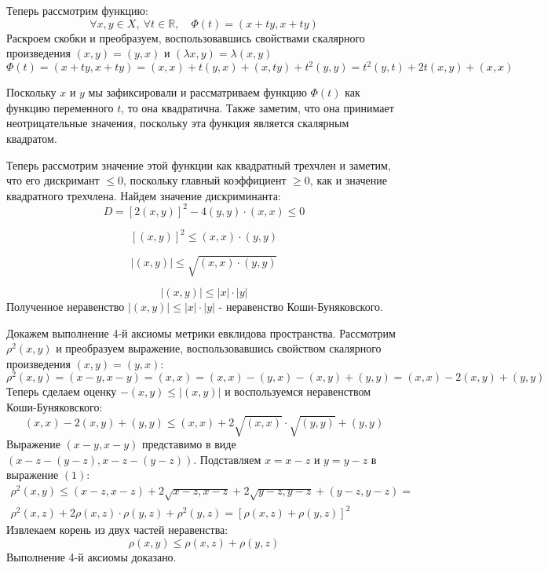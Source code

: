 Теперь рассмотрим функцию: 
$$
\forall x,y \in X, \: \forall t \in \mathbb {R}, \quad \Phi(t) = (x +ty, x + ty)
$$
Раскроем скобки и преобразуем, воспользовавшись свойствами скалярного произведения $(x, y) = (y, x)$ и $(\lambda x, y) = \lambda (x, y)$
$$
\Phi(t) = (x +ty, x + ty) = (x, x) + t(y, x) + (x, ty) + t^2(y, y) = t^2(y, t) + 2t(x, y) + (x, x)
$$

Поскольку $x$ и $y$ мы зафиксировали и рассматриваем  функцию $\Phi(t)$ как функцию переменного $t$, то она квадратична. Также заметим, что она принимает неотрицательные значения, поскольку эта функция является скалярным квадратом.

Теперь рассмотрим значение этой функции как квадратный трехчлен и заметим, что его дискримант $\leq 0$, поскольку главный коэффициент $\geq 0$, как и значение квадратного трехчлена. Найдем значение дискриминанта: 
$$
D = [2(x, y)]^2 - 4(y, y) \cdot (x, x) \leq 0
$$

$$
[(x, y)]^2 \leq (x, x) \cdot (y, y)
$$

$$
|(x, y)| \leq \sqrt{(x, x) \cdot (y, y)}
$$

$$
|(x, y)| \leq |x| \cdot |y|
$$
Полученное неравенство $|(x, y)| \leq |x| \cdot |y|$ - неравенство Коши-Буняковского.

Докажем выполнение 4-й аксиомы метрики евклидова пространства. Рассмотрим $\rho^2(x, y)$ и преобразуем выражение, воспользовавшись свойством скалярного произведения $(x, y) = (y, x)$:
$$
\rho^2(x, y) = (x - y, x - y) = (x, x) = (x, x) - (y, x) - (x, y) + (y, y) = (x, x) - 2(x, y) + (y, y)
$$
Теперь сделаем оценку $-(x, y) \leq |(x, y)|$ и воспользуемся неравенством Коши-Буняковского:
\begin{equation}
(x, x) - 2(x, y) + (y, y) \leq (x, x) + 2 \sqrt{(x, x)} \cdot \sqrt{(y, y)} + (y, y)
\end{equation}
Выражение $(x - y, x - y)$ представимо в виде $(x - z - (y - z), x - z - (y - z))$. Подставляем $x = x - z$ и $y = y - z$ в выражение $(1)$:
\begin{equation*}
\begin{gathered}
\rho^2(x, y) \leq (x - z, x - z) + 2\sqrt{x - z, x - z} + 2\sqrt{y - z, y - z} + (y - z, y - z) = \\
\rho^2(x, z) + 2\rho(x, z) \cdot \rho(y, z) + \rho^2(y, z) = [\rho(x, z) + \rho(y, z)]^2
\end{gathered}
\end{equation*}
Извлекаем корень из двух частей неравенства:
$$
\rho(x, y) \leq \rho(x, z) + \rho(y, z)
$$
Выполнение 4-й аксиомы доказано.

